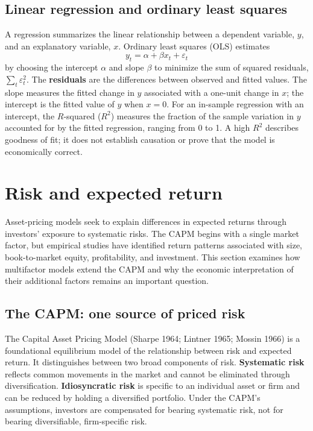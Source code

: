 \subsection{Linear regression and ordinary least squares}
\label{sec:03-regression}
A regression summarizes the linear relationship between a dependent variable, $y$, and an explanatory variable, $x$. Ordinary least squares (OLS) estimates
\begin{equation}
  y_t = \alpha + \beta x_t + \varepsilon_t
  \label{eq:03-ols}
\end{equation}
by choosing the intercept $\alpha$ and slope $\beta$ to minimize the sum of squared residuals, $\sum_t \varepsilon_t^2$. The \textbf{residuals} are the differences between observed and fitted values. The slope measures the fitted change in $y$ associated with a one-unit change in $x$; the intercept is the fitted value of $y$ when $x=0$. For an in-sample regression with an intercept, the $R$-squared ($R^2$) measures the fraction of the sample variation in $y$ accounted for by the fitted regression, ranging from 0 to 1. A high $R^2$ describes goodness of fit; it does not establish causation or prove that the model is economically correct.


\section{Risk and expected return}
\label{sec:03-decomposition}


Asset-pricing models seek to explain differences in expected returns through investors' exposure to systematic risks. The CAPM begins with a single market factor, but empirical studies have identified return patterns associated with size, book-to-market equity, profitability, and investment. This section examines how multifactor models extend the CAPM and why the economic interpretation of their additional factors remains an important question.


\subsection{The CAPM: one source of priced risk}
\label{sec:03-capm}
The Capital Asset Pricing Model (Sharpe 1964; Lintner 1965; Mossin 1966) is a foundational equilibrium model of the relationship between risk and expected return. It distinguishes between two broad components of risk. \textbf{Systematic risk} reflects common movements in the market and cannot be eliminated through diversification. \textbf{Idiosyncratic risk} is specific to an individual asset or firm and can be reduced by holding a diversified portfolio. Under the CAPM's assumptions, investors are compensated for bearing systematic risk, not for bearing diversifiable, firm-specific risk.

